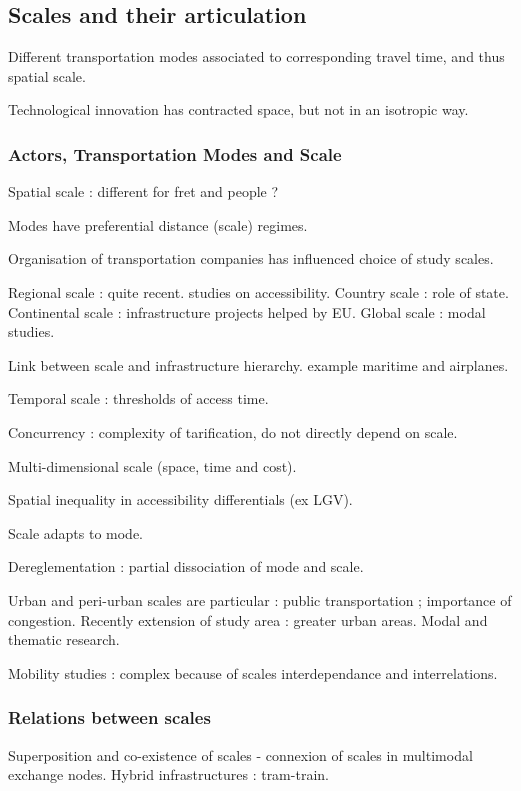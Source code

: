 \subsection{Scales and their articulation}

Different transportation modes associated to corresponding travel time, and thus spatial scale.

Technological innovation has contracted space, but not in an isotropic way.

\subsubsection{Actors, Transportation Modes and Scale}

Spatial scale : different for fret and people ?

Modes have preferential distance (scale) regimes.

Organisation of transportation companies has influenced choice of study scales.

Regional scale : quite recent. studies on accessibility. Country scale : role of state. Continental scale : infrastructure projects helped by EU. Global scale : modal studies.

Link between scale and infrastructure hierarchy. example maritime and airplanes.

Temporal scale : thresholds of access time.

Concurrency : complexity of tarification, do not directly depend on scale.

Multi-dimensional scale (space, time and cost).

Spatial inequality in accessibility differentials (ex LGV).

Scale adapts to mode.

Dereglementation : partial dissociation of mode and scale.

Urban and peri-urban scales are particular : public transportation ; importance of congestion. Recently extension of study area : greater urban areas. Modal and thematic research.

Mobility studies : complex because of scales interdependance and interrelations.

\subsubsection{Relations between scales}

Superposition and co-existence of scales - connexion of scales in multimodal exchange nodes. Hybrid infrastructures : tram-train.

